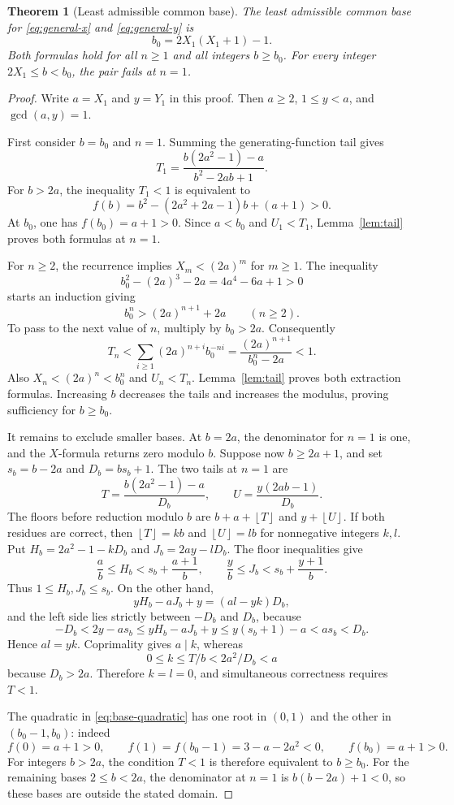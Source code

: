 \documentclass[11pt]{article}
\newtheorem{theorem}{Theorem}
\theoremstyle{remark}
\newcommand{\fl}[1]{\left\lfloor #1\right\rfloor}
\begin{document}
\begin{theorem}[Least admissible common base]\label{thm:general-base}
The least admissible common base for \eqref{eq:general-x} and
\eqref{eq:general-y} is
\begin{equation}\label{eq:base}
  b_0=2X_1(X_1+1)-1.
\end{equation}
Both formulas hold for all $n\ge1$ and all integers $b\ge b_0$.
For every integer $2X_1\le b<b_0$, the pair fails at $n=1$.
\end{theorem}

\begin{proof}
Write $a=X_1$ and $y=Y_1$ in this proof. Then $a\ge2$,
$1\le y<a$, and $\gcd(a,y)=1$.

First consider $b=b_0$ and $n=1$. Summing the generating-function
tail gives
\[
  T_1=\frac{b(2a^2-1)-a}{b^2-2ab+1}.
\]
For $b>2a$, the inequality $T_1<1$ is equivalent to
\begin{equation}\label{eq:base-quadratic}
  f(b)=b^2-(2a^2+2a-1)b+(a+1)>0.
\end{equation}
At $b_0$, one has $f(b_0)=a+1>0$.
Since $a<b_0$ and $U_1<T_1$, Lemma~\ref{lem:tail} proves both
formulas at $n=1$.

For $n\ge2$, the recurrence implies $X_m<(2a)^m$ for $m\ge1$.
The inequality
\[
  b_0^2-(2a)^3-2a=4a^4-6a+1>0
\]
starts an induction giving
\[
  b_0^n>(2a)^{n+1}+2a\qquad(n\ge2).
\]
To pass to the next value of $n$, multiply by $b_0>2a$.
Consequently
\[
  T_n<\sum_{i\ge1}(2a)^{n+i}b_0^{-ni}
      =\frac{(2a)^{n+1}}{b_0^n-2a}<1.
\]
Also $X_n<(2a)^n<b_0^n$ and $U_n<T_n$.
Lemma~\ref{lem:tail} proves both extraction formulas.
Increasing $b$ decreases the tails and increases the modulus, proving
sufficiency for $b\ge b_0$.

It remains to exclude smaller bases. At $b=2a$, the denominator for
$n=1$ is one, and the $X$-formula returns zero modulo $b$.
Suppose now $b\ge2a+1$, and set $s_b=b-2a$ and $D_b=bs_b+1$.
The two tails at $n=1$ are
\[
  T=\frac{b(2a^2-1)-a}{D_b},\qquad
  U=\frac{y(2ab-1)}{D_b}.
\]
The floors before reduction modulo $b$ are
$b+a+\fl T$ and $y+\fl U$.
If both residues are correct, then
$\fl T=kb$ and $\fl U=lb$ for nonnegative integers $k,l$.
Put $H_b=2a^2-1-kD_b$ and $J_b=2ay-lD_b$.
The floor inequalities give
\[
  \frac ab\le H_b<s_b+\frac{a+1}{b},\qquad
  \frac yb\le J_b<s_b+\frac{y+1}{b}.
\]
Thus $1\le H_b,J_b\le s_b$.
On the other hand,
\[
  yH_b-aJ_b+y=(al-yk)D_b,
\]
and the left side lies strictly between $-D_b$ and $D_b$, because
\[
  -D_b<2y-as_b\le yH_b-aJ_b+y
       \le y(s_b+1)-a<as_b<D_b.
\]
Hence $al=yk$. Coprimality gives $a\mid k$, whereas
\[
  0\le k\le T/b<2a^2/D_b<a
\]
because $D_b>2a$. Therefore $k=l=0$, and simultaneous correctness
requires $T<1$.

The quadratic in \eqref{eq:base-quadratic} has one root in $(0,1)$
and the other in $(b_0-1,b_0)$: indeed
\[
  f(0)=a+1>0,\qquad
  f(1)=f(b_0-1)=3-a-2a^2<0,\qquad f(b_0)=a+1>0.
\]
For integers $b>2a$, the condition $T<1$ is therefore equivalent
to $b\ge b_0$.
For the remaining bases $2\le b<2a$, the denominator at $n=1$ is
$b(b-2a)+1<0$, so these bases are outside the stated domain.
\end{proof}
\end{document}
